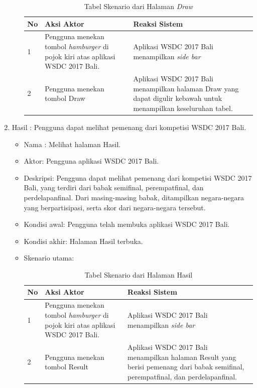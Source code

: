 \begin{enumerate}
\begin{itemize}
\begin{table}[H]
\begin{tabular}{|p{0.5cm}|p{7cm}|p{7cm}|}
				No & Aksi Aktor                               & Reaksi Sistem                                          \\ \hline
				1  & Pengguna menekan tombol {\it hamburger} di pojok kiri atas aplikasi WSDC 2017 Bali. & Aplikasi WSDC 2017 Bali menampilkan {\it side bar} \\ \hline
				2  & Pengguna menekan tombol Draw & Aplikasi WSDC 2017 Bali menampilkan halaman Draw yang dapat digulir kebawah untuk menampilkan keseluruhan tabel. \\ \hline
			\end{tabular}
			\caption{Tabel Skenario dari Halaman {\it Draw}}
			\label{table:skenarioHalamanDraw}
		\end{table}
	\end{itemize}
	\item Hasil : Pengguna dapat melihat pemenang dari kompetisi WSDC 2017 Bali.
	\begin{itemize}
		\item Nama : Melihat halaman Hasil.
		\item Aktor: Pengguna aplikasi WSDC 2017 Bali.
		\item Deskripsi: Pengguna dapat melihat pemenang dari kompetisi WSDC 2017 Bali, yang terdiri dari babak semifinal, perempatfinal, dan perdelapanfinal. Dari masing-masing babak, ditampilkan negara-negara yang berpartisipasi, serta skor dari negara-negara tersebut. 
		\item Kondisi awal: Pengguna telah membuka aplikasi WSDC 2017 Bali.
		\item Kondisi akhir: Halaman Hasil terbuka.
		\item Skenario utama: \\
		\begin{table}[H]
			\centering
			\begin{tabular}{|p{0.5cm}|p{7cm}|p{7cm}|}
				\hline
				No & Aksi Aktor                               & Reaksi Sistem                                          \\ \hline
				1  & Pengguna menekan tombol {\it hamburger} di pojok kiri atas aplikasi WSDC 2017 Bali. & Aplikasi WSDC 2017 Bali menampilkan {\it side bar} \\ \hline
				2  & Pengguna menekan tombol Result & Aplikasi WSDC 2017 Bali menampilkan halaman Result yang berisi pemenang dari babak semifinal, perempatfinal, dan perdelapanfinal. \\ \hline
			\end{tabular}
			\caption{Tabel Skenario dari Halaman Hasil}

\end{table}
\end{itemize}
\end{enumerate}

